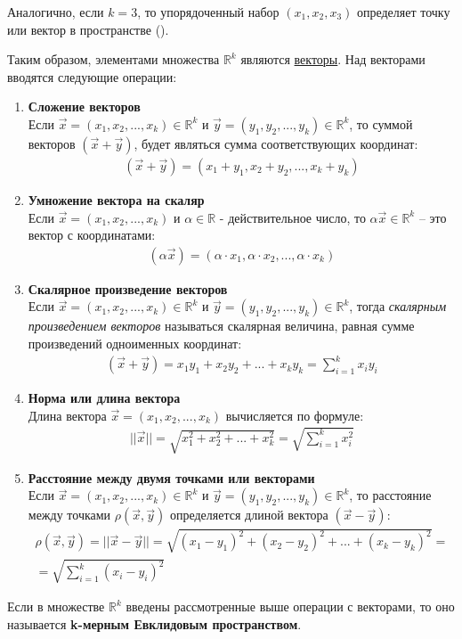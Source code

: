Аналогично, если $k=3$, то упорядоченный набор $(x_1, x_2, x_3)$ определяет точку или вектор в пространстве ().

Таким образом, элементами множества $\mathbb{R}^k$ являются \uline{векторы}. Над векторами вводятся следующие операции:
\begin{enumerate}
	\item \textbf{Сложение векторов}\\
	Если $\vec{x} = (x_1, x_2, ..., x_k) \in \mathbb{R}^k$ и $\vec{y} = (y_1, y_2, ..., y_k) \in \mathbb{R}^k$, то суммой векторов $(\vec{x} + \vec{y})$, будет являться сумма соответствующих координат:
	\begin{align} \label{1.1.1}
		(\vec{x} + \vec{y}) = (x_1 + y_1, x_2 + y_2, ..., x_k + y_k)
	\end{align}

	\item \textbf{Умножение вектора на скаляр}\\
	Если $\vec{x} = (x_1, x_2, ..., x_k)$ и $\alpha \in \mathbb R$ - действительное число, то $\alpha \vec{x} \in \mathbb{R}^k$ -- это вектор с координатами:
	\begin{align} \label{eq:1.1.2}
		(\alpha\vec{x}) = (\alpha \cdot x_1, \alpha \cdot x_2, ..., \alpha \cdot x_k)
	\end{align}

	\item \textbf{Скалярное произведение векторов}\\
	Если $\vec{x} = (x_1, x_2, ..., x_k) \in \mathbb{R}^k$ и $\vec{y} = (y_1, y_2, ..., y_k) \in \mathbb{R}^k$, тогда \textit{скалярным произведением векторов} называться скалярная величина, равная сумме произведений одноименных координат:
	\begin{align} \label{eq:1.1.3}
		(\vec{x} + \vec{y}) = x_1 y_1 + x_2 y_2 + ... + x_k y_k = \sum_{i = 1}^{k} x_i y_i
	\end{align}

	\item \textbf{Норма или длина вектора}\\
	Длина вектора $\vec{x} = (x_1, x_2, ..., x_k)$ вычисляется по формуле:
	\begin{align} \label{eq:1.1.4}
		||\vec{x}|| = \sqrt{x_1^2 + x_2^2 + ... + x_k^2} = \sqrt{\sum_{i=1}^{k} x_i^2}
	\end{align}

	\item \textbf{Расстояние между двумя точками или векторами}\\
	Если $\vec{x} = (x_1, x_2, ..., x_k) \in \mathbb{R}^k$ и $\vec{y} = (y_1, y_2, ..., y_k) \in \mathbb{R}^k$, то расстояние между точками $\rho(\vec{x}, \vec{y})$ определяется длиной вектора $(\vec{x} - \vec{y})$:
	\begin{multline} \label{eq:1.1.5}
		\rho(\vec{x}, \vec{y}) = ||\vec{x} - \vec{y}|| = \sqrt{(x_1 - y_1)^2 + (x_2 - y_2)^2 + ... + (x_k - y_k)^2} = \\ = \sqrt{\sum_{i=1}^{k} (x_i - y_i)^2}
	\end{multline}
\end{enumerate}

Если в множестве $\mathbb{R}^k$ введены рассмотренные выше операции с векторами, то оно называется \textbf{k-мерным Евклидовым пространством}.
